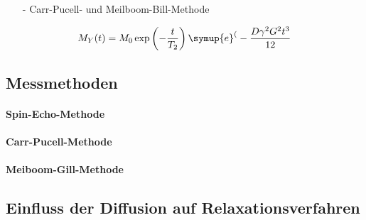 \begin{itemize}
  \item[-] Carr-Pucell- und Meilboom-Bill-Methode\\



\end{itemize}


\begin{align}
M_Y(t) = M_0\exp\left(-\frac{t}{T_2}\right)
\symup{e}^(-\frac{D\gamma^2 G^2 t^3}{12} \label{}
\end{align}

\subsection{Messmethoden}
\paragraph{Spin-Echo-Methode}
\paragraph{Carr-Pucell-Methode}
\paragraph{Meiboom-Gill-Methode}
\subsection{Einfluss der Diffusion auf Relaxationsverfahren}


\cite{sample}

